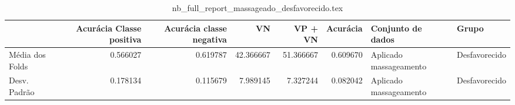 \begin{table}
\centering
\caption{nb_full_report_massageado_desfavorecido.tex}
\label{nb_full_report_massageado_desfavorecido.tex}
\begin{tabular}{lrrrrrll}
\toprule
{}              &  Acurácia Classe positiva &  Acurácia classe negativa &        VN  &   VP + VN  &  Acurácia &       Conjunto de dados &          Grupo \\
\midrule
Média dos Folds &                  0.566027 &                  0.619787 &  42.366667 &  51.366667 &  0.609670 &  Aplicado massageamento &  Desfavorecido \\
Desv. Padrão    &                  0.178134 &                  0.115679 &   7.989145 &   7.327244 &  0.082042 &  Aplicado massageamento &  Desfavorecido \\
\bottomrule
\end{tabular}
\end{table}
